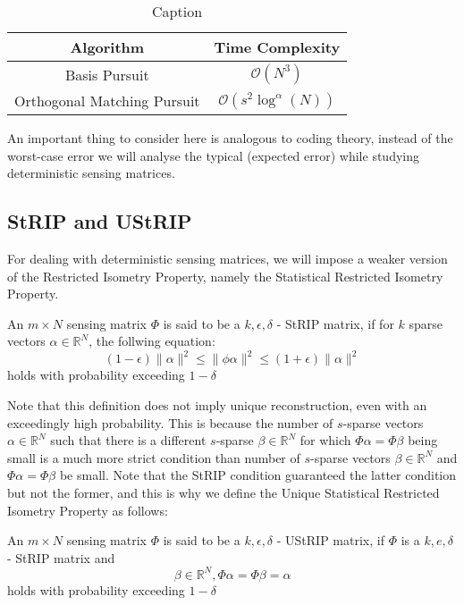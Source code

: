\documentclass[12pt]{article}
\begin{document}
{\begin{table}[H]
    \centering
    \begin{tabular}{c|c}
        Algorithm & Time Complexity  \\
        \hline
         Basis Pursuit & $\mathcal{O}(N^3)$ \\
         Orthogonal Matching Pursuit & $\mathcal{O}(s^2\log^{\alpha}(N))$ \\
    \end{tabular}
    \caption{Caption}
    \label{tab:my_label}
\end{table}

An important thing to consider here is analogous to coding theory, instead of the worst-case error we will analyse the typical (expected error) while studying deterministic sensing matrices. 

\subsection{StRIP and UStRIP}
For dealing with deterministic sensing matrices, we will impose a weaker version of the Restricted Isometry Property, namely the Statistical Restricted Isometry Property.


\begin{defn}
An $m \times N$ sensing matrix $\Phi$ is said to be a $k, \epsilon, \delta $ - StRIP matrix, if for $k$ sparse vectors $\alpha \in \mathbb{R}^N$, the follwing equation:
\begin{equation}
    (1 - \epsilon)\lVert \alpha \rVert^2 \leq \lVert \phi\alpha \rVert^2 \leq (1 + \epsilon)\lVert \alpha \rVert^2
\end{equation}
holds with probability exceeding $1 - \delta$
\end{defn}

Note that this definition does not imply unique reconstruction, even with an exceedingly high probability. This is because the number of $s$-sparse vectors $\alpha \in \mathbb{R}^N$ such that there is a different $s$-sparse $\beta \in \mathbb{R}^N$ for which $\Phi\alpha = \Phi\beta$ being small is a much more strict condition than number of $s$-sparse vectors $\beta \in \mathbb{R}^N$ and $\Phi\alpha = \Phi\beta$ be small. Note that the StRIP condition guaranteed the latter condition but not the former, and this is why we define the Unique Statistical Restricted Isometry Property as follows:

\begin{defn}
An $m \times N$ sensing matrix $\Phi$ is said to be a $k, \epsilon, \delta $ - UStRIP matrix, if $\Phi$ is a $k, e, \delta$ - StRIP matrix and
\begin{equation}
    {\beta \in \mathbb{R}^N, \Phi\alpha = \Phi\beta} = {\alpha}
\end{equation}
holds with probability exceeding $1 - \delta$
\end{defn}

}
\end{document}

